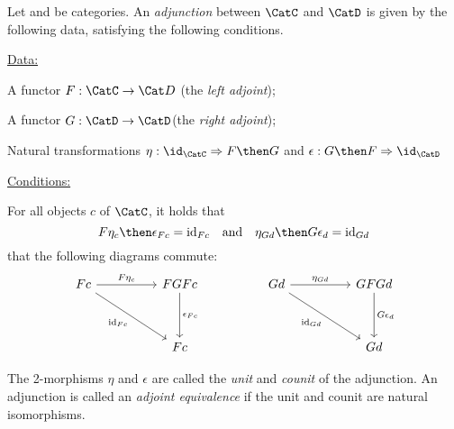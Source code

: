 \begin{ctdefinition}[]
\label{def:cat-equivalence}
Let \CatC and \CatD be categories. An \emph{adjunction} between $\CatC$ and $\CatD$ is given by the following data, satisfying the following conditions. 

\underline{Data:}
\begin{compactenum}
\item A functor $F:  \CatC \rightarrow \Cat D$ (the \emph{left adjoint});
\item A functor $G: \CatD \rightarrow \CatD$(the \emph{right adjoint}); 
\item Natural transformations $\eta : \id_\CatC \Rightarrow F \then G$ and $\epsilon : G \then F \Rightarrow \id_\CatD$
\end{compactenum}

\underline{Conditions:}
\begin{compactenum}
\item For all objects $c$ of $\CatC$, it holds that 
$$
F\eta_c \then \epsilon_{Fc} = \text{id}_{Fc} \quad \text{and}  \quad  \eta_{Gd} \then G\epsilon_d = \text{id}_{Gd}
$$
 that the following diagrams commute: 
\[\begin{tikzcd}
	Fc && FGFc && Gd && GFGd \\
	\\
	&& Fc &&&& Gd
	\arrow["{F\eta_c}", from=1-1, to=1-3]
	\arrow["{\epsilon_{Fc}}", from=1-3, to=3-3]
	\arrow["{\text{id}_{Fc}}"', from=1-1, to=3-3]
	\arrow["{\text{id}_{Gd}}"', from=1-5, to=3-7]
	\arrow["{\eta_{Gd}}", from=1-5, to=1-7]
	\arrow["{G\epsilon_d}", from=1-7, to=3-7]
\end{tikzcd}\]
\end{compactenum}
The 2-morphisms $\eta$ and $\epsilon$ are called the \emph{unit} and \emph{counit} of the adjunction. An adjunction is called an \emph{adjoint equivalence} if the unit and counit are natural isomorphisms. 
\end{ctdefinition}






